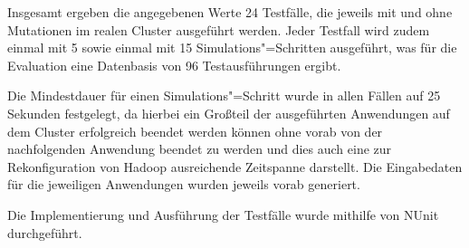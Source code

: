Insgesamt ergeben die angegebenen Werte 24 Testfälle, die jeweils mit und ohne Mutationen im realen Cluster ausgeführt werden.
Jeder Testfall wird zudem einmal mit 5 sowie einmal mit 15 Simulations"=Schritten ausgeführt, was für die Evaluation eine Datenbasis von 96 Testausführungen ergibt.

Die Mindestdauer für einen Simulations"=Schritt wurde in allen Fällen auf 25 Sekunden festgelegt, da hierbei ein Großteil der ausgeführten Anwendungen auf dem Cluster erfolgreich beendet werden können ohne vorab von der nachfolgenden Anwendung beendet zu werden und dies auch eine zur Rekonfiguration von Hadoop ausreichende Zeitspanne darstellt.
Die Eingabedaten für die jeweiligen Anwendungen wurden jeweils vorab generiert.

Die Implementierung und Ausführung der Testfälle wurde mithilfe von NUnit durchgeführt.
